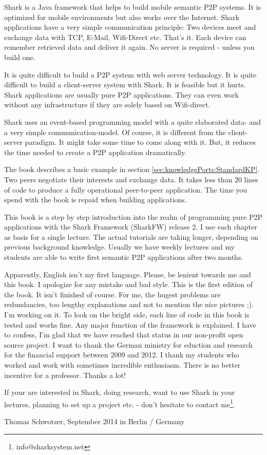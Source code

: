 Shark is a Java framework that helps to build mobile semantic P2P systems. It is optimized for mobile environments but also works over the Internet. Shark applications have a very simple communication principle: Two devices meet and exchange data with TCP, E-Mail, Wifi-Direct etc. That's it. Each device can remember retrieved data and deliver it again. No server is required - unless you build one. 

It is quite difficult to build a P2P system with web server technology. It is quite difficult to build a client-server system with Shark. It is feasible but it hurts. Shark applications are usually pure P2P applications. They can even work without any infrastructure if they are solely based on Wifi-direct.

Shark uses an event-based programming model with a quite elaborated data- and a very simple communication-model. Of course, it is different from the client-server paradigm. It might take some time to come along with it. But, it reduces the time needed to create a P2P application dramatically. 

The book describes a basic example in section \ref{sec:knowledgePorts:StandardKP}. Two peers negotiate their interests and exchange data. It takes less than 20 lines of code to produce a fully operational peer-to-peer application. The time you spend with the book is repaid when building applications.

This book is a step by step introduction into the realm of programming pure 
P2P applications with the Shark Framework (SharkFW) release 2. I use each 
chapter as basis for a single lecture. The actual tutorials are taking longer, depending on previous background knowledge. Usually we have weekly lectures and my students are able to write first semantic P2P applications after two months.

Apparently, English isn't my first language. Please, be lenient towards me and this book. I apologize for any mistake and bad style. This is the first edition of the book. It isn't finished of course. For me, the hugest problems are redundancies, too lengthy explanations and not to mention the nice pictures ;). I'm working on it. To look on the bright side, each line of code in this book is tested and works fine. Any major function of the framework is explained. I have to confess, I'm glad that we have reached that status in our non-profit open source project.
I want to thank the German ministry for eduction and research for the financial support between 2009 and 2012. I thank my students who worked and work with sometimes incredible enthusiasm. There is no better incentive for a professor. Thanks a lot!

If your are interested in Shark, doing research, want to use Shark in your lectures, planning to set up a project etc. - don't hesitate to contact me\footnote{info@sharksystem.net}.

\vspace{1,5cm}

Thomas Schwotzer, September 2014 in Berlin / Germany
